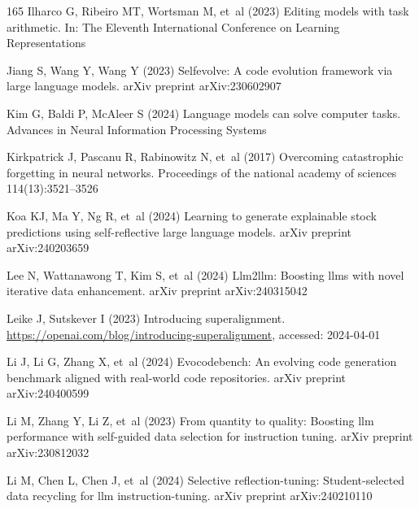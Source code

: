 \documentclass[sn-basic, Numbered]{sn-jnl}%
\theoremstyle{thmstyleone}%
\theoremstyle{thmstyletwo}%
\theoremstyle{thmstylethree}%
\begin{document}
\begin{thebibliography}{165}
Ilharco G, Ribeiro MT, Wortsman M, et~al (2023) Editing models with task arithmetic. In: The Eleventh International Conference on Learning Representations

Jiang S, Wang Y, Wang Y (2023) Selfevolve: A code evolution framework via large language models. arXiv preprint arXiv:230602907

Kim G, Baldi P, McAleer S (2024) Language models can solve computer tasks. Advances in Neural Information Processing Systems

Kirkpatrick J, Pascanu R, Rabinowitz N, et~al (2017) Overcoming catastrophic forgetting in neural networks. Proceedings of the national academy of sciences 114(13):3521--3526

Koa KJ, Ma Y, Ng R, et~al (2024) Learning to generate explainable stock predictions using self-reflective large language models. arXiv preprint arXiv:240203659

Lee N, Wattanawong T, Kim S, et~al (2024) Llm2llm: Boosting llms with novel iterative data enhancement. arXiv preprint arXiv:240315042

Leike J, Sutskever I (2023) Introducing superalignment. \urlprefix\url{https://openai.com/blog/introducing-superalignment}, accessed: 2024-04-01

Li J, Li G, Zhang X, et~al (2024{}) Evocodebench: An evolving code generation benchmark aligned with real-world code repositories. arXiv preprint arXiv:240400599

Li M, Zhang Y, Li Z, et~al (2023) From quantity to quality: Boosting llm performance with self-guided data selection for instruction tuning. arXiv preprint arXiv:230812032

Li M, Chen L, Chen J, et~al (2024{}) Selective reflection-tuning: Student-selected data recycling for llm instruction-tuning. arXiv preprint arXiv:240210110


\end{thebibliography}
\end{document}
